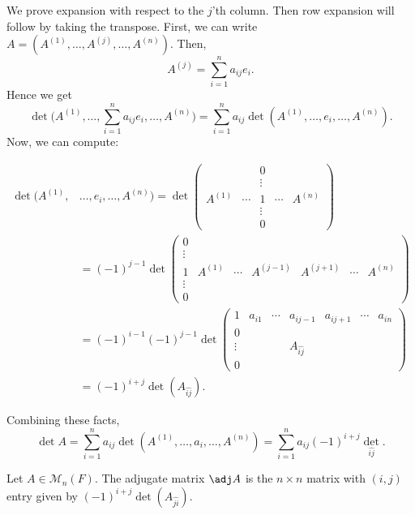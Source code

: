 \documentclass[12pt]{article}
\begin{document}
\begin{proofbox}
	We prove expansion with respect to the $j$'th column. Then row expansion will follow by taking the transpose. First, we can write $A = (A^{(1)}, \ldots, A^{(j)}, \ldots, A^{(n)})$. Then,
	\[
		A^{(j)} = \sum_{i = 1}^{n} a_{ij}e_i
	.\]
	Hence we get
	\[
		\det \Biggl( A^{(1)}, \ldots, \sum_{i = 1}^{n} a_{ij}e_i, \ldots, A^{(n)} \Biggr) = \sum_{i= 1}^{n} a_{ij} \det (A^{(1)}, \ldots, e_i, \ldots, A^{(n)})
	.\]
	Now, we can compute:

	\begin{align*}
		\det(A^{(1)}, &\ldots, e_i, \ldots, A^{(n)}) = \det
		\begin{pmatrix}
			& & 0 & & \\
			& & \vdots & & \\
			A^{(1)} & \cdots & 1 & \cdots & A^{(n)} \\
			& & \vdots & & \\
			& & 0 & &
		\end{pmatrix}
		\\
							    &= (-1)^{j-1} \det
							    \begin{pmatrix}
								    0 & & & & & & \\
								    \vdots & & & & & & \\
								    1 & A^{(1)} & \cdots & A^{(j-1)} & A^{(j+1)} & \cdots & A^{(n)} \\
								    \vdots & & & & & & \\
								    0 & & & & & &
							    \end{pmatrix} \\
							    &= (-1)^{i-1}(-1)^{j-1} \det
							    \begin{pmatrix}
								    1 & a_{i1} & \cdots & a_{ij-1} & a_{ij+1} & \cdots & a_{in} \\
								    0 && & & & & \\
								    \vdots & & & A_{\widehat{ij}} & & & \\
								    0 & & & & & &
							    \end{pmatrix}
							    \\
							    &= (-1)^{i+j}\det(A_{\widehat{ij}}).
	\end{align*}

	Combining these facts,
	\[
	\det A = \sum_{i = 1}^{n} a_{ij} \det(A^{(1)}, \ldots, a_i, \ldots, A^{(n)}) = \sum_{i = 1}^{n} a_{ij}(-1)^{i+j}\det_{\widehat{ij}}
	.\]
\end{proofbox}

\begin{definition}
	Let $A \in \mathcal{M}_n(F)$. The adjugate matrix $\adj A$ is the $n \times n$ matrix with $(i, j)$ entry given by $(-1)^{i+j}\det(A_{\widehat{ji}})$.
\end{definition}
\end{document}
